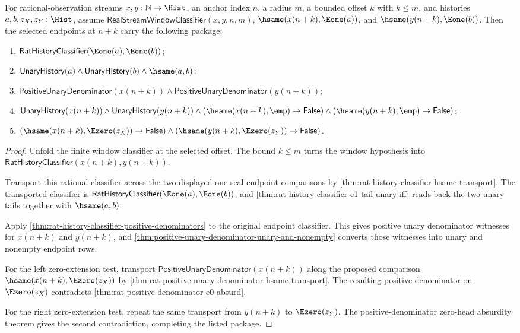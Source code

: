 \begin{theorem}
\label{thm:real-stream-window-selected-full-shape-readback-package}
For rational-observation streams $x,y:\mathbb{N}\to\Hist$, an anchor index
$n$, a radius $m$, a bounded offset $k$ with $k\le m$, and histories
$a,b,z_X,z_Y:\Hist$, assume
$\mathsf{RealStreamWindowClassifier}(x,y,n,m)$,
$\hsame(x(n+k),\Eone(a))$, and $\hsame(y(n+k),\Eone(b))$. Then the selected
endpoints at $n+k$ carry the following package:
\begin{enumerate}
\item $\mathsf{RatHistoryClassifier}(\Eone(a),\Eone(b))$;
\item $\mathsf{UnaryHistory}(a)\land \mathsf{UnaryHistory}(b)\land
\hsame(a,b)$;
\item $\mathsf{PositiveUnaryDenominator}(x(n+k))\land
\mathsf{PositiveUnaryDenominator}(y(n+k))$;
\item $\mathsf{UnaryHistory}(x(n+k))\land
\mathsf{UnaryHistory}(y(n+k))\land
(\hsame(x(n+k),\emp)\to\mathsf{False})\land
(\hsame(y(n+k),\emp)\to\mathsf{False})$;
\item $(\hsame(x(n+k),\Ezero(z_X))\to\mathsf{False})\land
(\hsame(y(n+k),\Ezero(z_Y))\to\mathsf{False})$.
\end{enumerate}
\end{theorem}
\begin{proof}
Unfold the finite window classifier at the selected offset. The bound $k\le m$
turns the window hypothesis into
$\mathsf{RatHistoryClassifier}(x(n+k),y(n+k))$.

Transport this rational classifier across the two displayed one-seal endpoint
comparisons by \autoref{thm:rat-history-classifier-hsame-transport}. The
transported classifier is
$\mathsf{RatHistoryClassifier}(\Eone(a),\Eone(b))$, and
\autoref{thm:rat-history-classifier-e1-tail-unary-iff} reads back the two
unary tails together with $\hsame(a,b)$.

Apply \autoref{thm:rat-history-classifier-positive-denominators} to the
original endpoint classifier. This gives positive unary denominator witnesses
for $x(n+k)$ and $y(n+k)$, and
\autoref{thm:positive-unary-denominator-unary-and-nonempty} converts those
witnesses into unary and nonempty endpoint rows.

For the left zero-extension test, transport
$\mathsf{PositiveUnaryDenominator}(x(n+k))$ along the proposed comparison
$\hsame(x(n+k),\Ezero(z_X))$ by
\autoref{thm:rat-positive-unary-denominator-hsame-transport}. The resulting
positive denominator on $\Ezero(z_X)$ contradicts
\autoref{thm:rat-positive-denominator-e0-absurd}.

For the right zero-extension test, repeat the same transport from $y(n+k)$ to
$\Ezero(z_Y)$. The positive-denominator zero-head absurdity theorem gives the
second contradiction, completing the listed package.
\end{proof}

